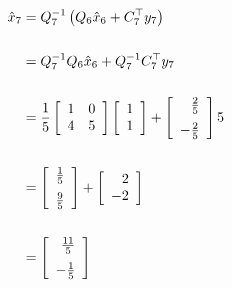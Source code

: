 \documentclass[letterpaper]{article}
\begin{document}
\begin{enumerate}
  \begin{align*}
 \hat{x}_{7} &=Q_{7}^{-1} \left( Q_6\hat{x}_6+C_{7}^\top y_{7} \right)\\
 \\
 &=Q_{7}^{-1}  Q_6\hat{x}_6+ Q_{7}^{-1}C_{7}^\top y_{7} \\
 \\
 &= \frac{1}{5}\left[ \begin{array}{rr}  1&  0\\  4& 5\end{array} \right]  \left[ \begin{array}{c} 1 \\ 1 \end{array} \right] +\left[ \begin{array}{r} \frac{2}{5}  \medskip \\ -\frac{2}{5}\end{array} \right] 5
 \\
 \\
 &= \left[ \begin{array}{r} \frac{1}{5}  \medskip \\ \frac{9}{5}\end{array} \right] + \left[ \begin{array}{r} 2 \\ -2 \end{array} \right] \\
 \\
  &= \left[ \begin{array}{r} \frac{11}{5}  \medskip \\ -\frac{1}{5}\end{array} \right]
 \end{align*}



\end{enumerate}


\newpage
\end{document}
